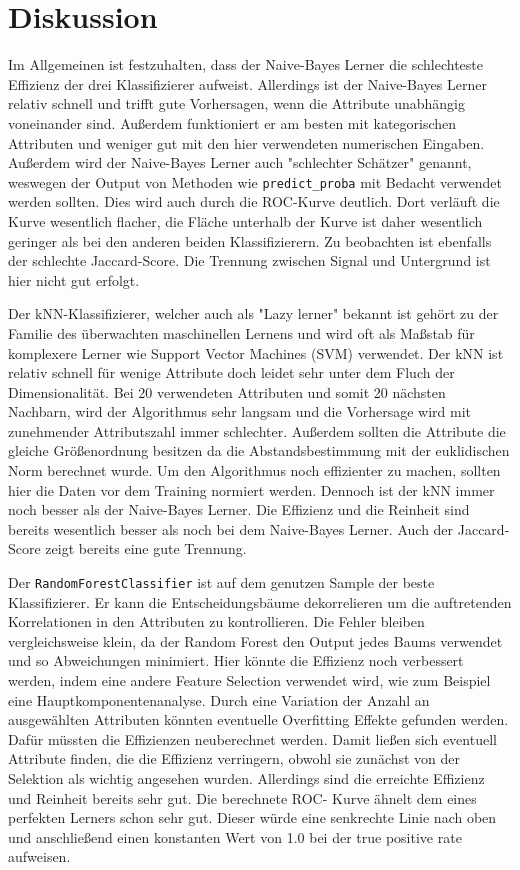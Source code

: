 \section{Diskussion}
\label{sec:discussion}

Im Allgemeinen ist festzuhalten, dass der Naive-Bayes Lerner die schlechteste 
Effizienz der drei Klassifizierer aufweist.
Allerdings ist der Naive-Bayes Lerner relativ schnell und trifft gute Vorhersagen, 
wenn die Attribute unabh\"angig voneinander sind. Au\ss erdem funktioniert er am 
besten mit kategorischen Attributen und weniger gut mit den hier verwendeten 
numerischen Eingaben.
Au\ss erdem wird der Naive-Bayes Lerner auch "schlechter Sch\"atzer" genannt, 
weswegen der Output von Methoden wie \texttt{predict\_proba} mit Bedacht 
verwendet werden sollten.
Dies wird auch durch die ROC-Kurve deutlich.
Dort verläuft die Kurve wesentlich flacher, die Fläche unterhalb der Kurve ist 
daher wesentlich geringer als bei den anderen beiden Klassifizierern.
Zu beobachten ist ebenfalls der schlechte Jaccard-Score.
Die Trennung zwischen Signal und Untergrund ist hier nicht gut erfolgt.

Der kNN-Klassifizierer, welcher auch als "Lazy lerner" bekannt ist geh\"ort zu 
der Familie des \"uberwachten maschinellen Lernens und wird oft als Maßstab 
f\"ur komplexere Lerner wie Support Vector Machines (SVM) verwendet.
Der kNN ist relativ schnell f\"ur wenige Attribute doch leidet sehr unter dem 
Fluch der Dimensionalit\"at. Bei 20 verwendeten Attributen und somit 20 
n\"achsten Nachbarn, wird der Algorithmus sehr langsam und die Vorhersage 
wird mit zunehmender Attributszahl immer schlechter.
Au\ss erdem sollten die Attribute die gleiche Gr\"o\ss enordnung besitzen da die 
Abstandsbestimmung mit der euklidischen Norm berechnet wurde. Um den Algorithmus 
noch effizienter zu machen, sollten hier die Daten vor dem Training normiert 
werden.
Dennoch ist der kNN immer noch besser als der Naive-Bayes Lerner.
Die Effizienz und die Reinheit sind bereits wesentlich besser als noch bei dem 
Naive-Bayes Lerner.
Auch der Jaccard-Score zeigt bereits eine gute Trennung.

Der \texttt{RandomForestClassifier} ist auf dem genutzen Sample der beste 
Klassifizierer. Er kann die Entscheidungsbäume dekorrelieren um die auftretenden 
Korrelationen in den Attributen zu kontrollieren.
Die Fehler bleiben vergleichsweise klein, da der Random Forest den Output jedes 
Baums verwendet und so Abweichungen minimiert.
Hier k\"onnte die Effizienz noch verbessert werden, indem eine andere Feature 
Selection verwendet wird, wie zum Beispiel eine Hauptkomponentenanalyse.
Durch eine Variation der Anzahl an ausgewählten Attributen könnten eventuelle 
Overfitting Effekte gefunden werden.
Dafür müssten die Effizienzen neuberechnet werden.
Damit ließen sich eventuell Attribute finden, die die Effizienz verringern, 
obwohl sie zunächst von der Selektion als wichtig angesehen wurden.
Allerdings sind die erreichte Effizienz und Reinheit bereits sehr gut.
Die berechnete ROC- Kurve ähnelt dem eines perfekten Lerners schon sehr gut.
Dieser würde eine senkrechte Linie nach oben und anschließend einen konstanten 
Wert von 1.0 bei der true positive rate aufweisen.

